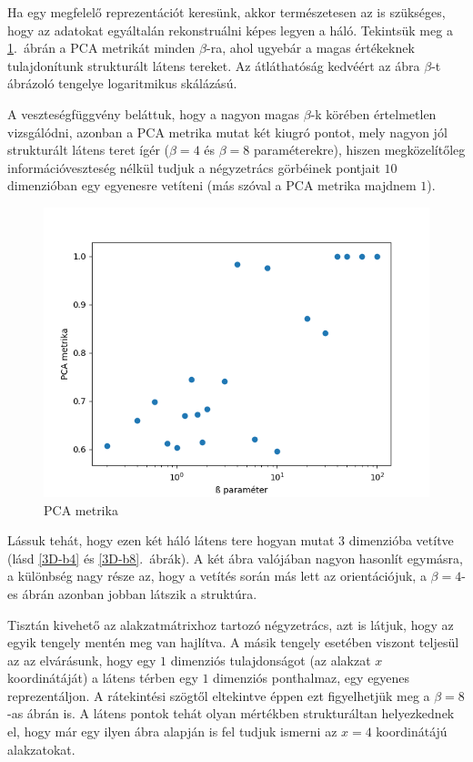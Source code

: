 Ha egy megfelelő reprezentációt keresünk, akkor természetesen az is szükséges, hogy az adatokat egyáltalán rekonstruálni képes legyen a háló. Tekintsük meg a \ref{beta-pca}.~ábrán a PCA metrikát minden $\beta$-ra, ahol ugyebár a magas értékeknek tulajdonítunk strukturált látens tereket. Az átláthatóság kedvéért az ábra $\beta$-t ábrázoló tengelye logaritmikus skálázású.

A veszteségfüggvény beláttuk, hogy a nagyon magas $\beta$-k körében értelmetlen vizsgálódni, azonban a PCA metrika mutat két kiugró pontot, mely nagyon jól strukturált látens teret ígér ($\beta=4$ és $\beta=8$ paraméterekre), hiszen megközelítőleg információveszteség nélkül tudjuk a négyzetrács görbéinek pontjait $10$ dimenzióban egy egyenesre vetíteni (más szóval a PCA metrika majdnem $1$).

\begin{figure}[h!]
\begin{center}
 
  \includegraphics[width=0.75\linewidth]{metrics/vae_beta-pca-log.png}
  \caption{PCA metrika} \label{beta-pca}
\end{center}
\end{figure}

Lássuk tehát, hogy ezen két háló látens tere hogyan mutat $3$ dimenzióba vetítve (lásd \ref{3D-b4} és \ref{3D-b8}.~ábrák). A két ábra valójában nagyon hasonlít egymásra, a különbség nagy része az, hogy a vetítés során más lett az orientációjuk, a $\beta=4$-es ábrán azonban jobban látszik a struktúra.

Tisztán kivehető az alakzatmátrixhoz tartozó négyzetrács, azt is látjuk, hogy az egyik tengely mentén meg van hajlítva. A másik tengely esetében viszont teljesül az az elvárásunk, hogy egy $1$ dimenziós tulajdonságot (az alakzat $x$ koordinátáját) a látens térben egy $1$ dimenziós ponthalmaz, egy egyenes reprezentáljon. A rátekintési szögtől eltekintve éppen ezt figyelhetjük meg a $\beta=8$-as ábrán is. A látens pontok tehát olyan mértékben strukturáltan helyezkednek el, hogy már egy ilyen ábra alapján is fel tudjuk ismerni az $x=4$ koordinátájú alakzatokat.

